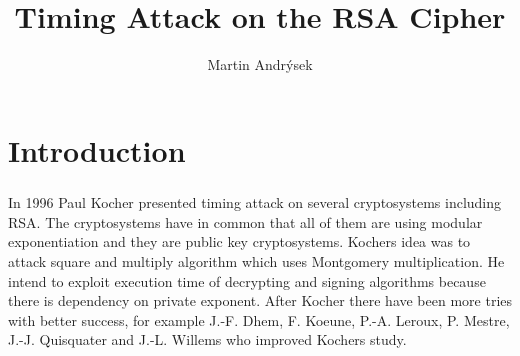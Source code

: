 \documentclass[thesis=B,english]{FITthesis}[2012/10/20]
\title{Timing Attack on the RSA Cipher}
\author{Martin Andr{\' y}sek} %
\begin{document}

\chapter{Introduction}

\paragraph*{}{
In 1996 Paul Kocher presented timing attack on several cryptosystems including RSA. The cryptosystems have in common that all of them are using modular exponentiation and
they are public key cryptosystems. Kochers 
idea was to attack square and multiply algorithm which uses Montgomery multiplication. He intend to exploit execution time of decrypting and signing algorithms because there is 
dependency on private exponent. After Kocher
there have been more tries with better success, for example J.-F. Dhem, F. Koeune, P.-A. Leroux, P. Mestre,
J.-J. Quisquater and J.-L. Willems who improved Kochers study.}
\end{document}
